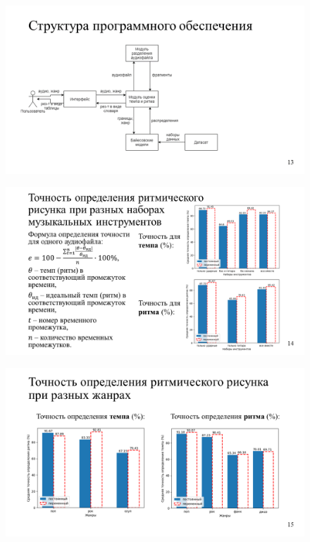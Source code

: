 \begin{figure}[h!]
	\begin{center}
		\includegraphics[angle=90,scale=0.75]{slides/Slide13.png}
	\end{center}
\end{figure}

\begin{figure}[h!]
	\begin{center}
		\includegraphics[angle=90,scale=0.75]{slides/Slide14.png}
	\end{center}
\end{figure}

\begin{figure}[h!]
	\begin{center}
		\includegraphics[angle=90,scale=0.75]{slides/Slide15.png}
	\end{center}
\end{figure}

